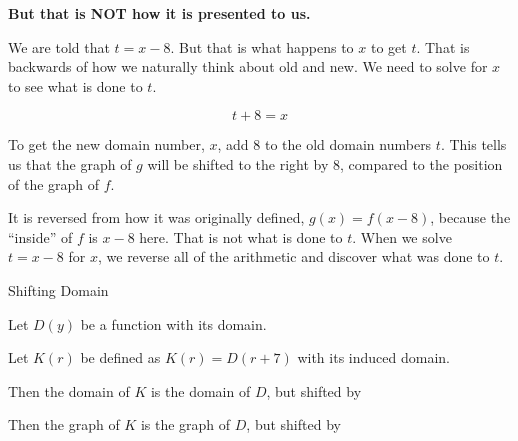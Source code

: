 \documentclass{ximera}
\begin{document}
\begin{center}
\textbf{\textcolor{red!70!black}{But that is NOT how it is presented to us.}}
\end{center}






We are told that $t=x-8$.  But that is what happens to $x$ to get $t$.  That is backwards of how we naturally think about old and new.  We need to solve for $x$ to see what is done to $t$.

\[ t+8=x \]

To get the new domain number, $x$, add $8$ to the old domain numbers $t$.  This tells us that the graph of $g$ will be shifted to the right by $8$, compared to the position of the graph of $f$.


It is reversed from how it was originally defined, $g(x) = f(x-8)$, because the ``inside'' of $f$ is $x-8$ here.  That is not what is done to $t$.  When we solve $t=x-8$ for $x$, we reverse all of the arithmetic and discover what was done to $t$.




\begin{example} Shifting Domain


Let $D(y)$ be a function with its domain.

Let $K(r)$ be defined as $K(r) = D(r+7)$ with its induced domain.


Then the domain of $K$ is the domain of $D$, but shifted  by 


Then the graph of $K$ is the graph of $D$, but shifted  by 




\end{example}
\end{document}
